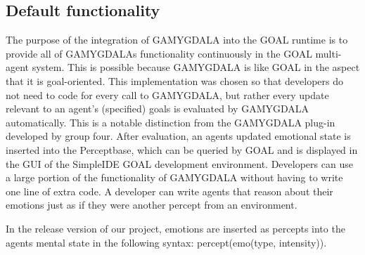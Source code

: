 \documentclass[11pt]{article}
\begin{document}
\subsection{Default functionality}
The purpose of the integration of \gls{GAMYGDALA}\cite{GAMYGDALA} into the \gls{GOAL}\cite{GOAL} runtime is to provide all of GAMYGDALAs functionality continuously in the GOAL multi-agent system. This is possible because GAMYGDALA is like GOAL in the aspect that it is goal-oriented. This implementation was chosen so that developers do not need to code for every call to GAMYGDALA, but rather every update relevant to an agent's (specified) goals is evaluated by GAMYGDALA automatically. This is a notable distinction from the GAMYGDALA plug-in developed by group four. After evaluation, an agents updated emotional state is inserted into the Perceptbase, which can be queried by GOAL and is displayed in the GUI of the SimpleIDE\cite{SimpleIDE} GOAL development environment. Developers can use a large portion of the functionality of GAMYGDALA without having to write one line of extra code. A developer can write agents that reason about their emotions just as if they were another percept from an environment.

In the release version of our project, emotions are inserted as percepts into the agents mental state in the following syntax: percept(emo(type, intensity)).
\end{document}
